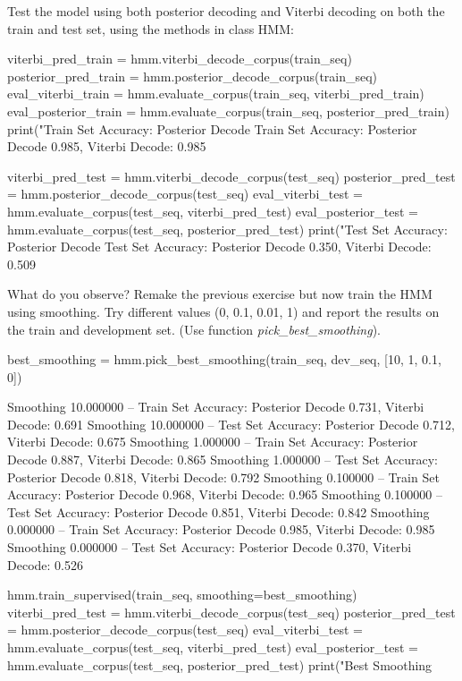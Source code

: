 \begin{exercise}
Test the model using both posterior decoding and Viterbi decoding on
both the train and test set, using the methods in class HMM:
\begin{python}
viterbi_pred_train = hmm.viterbi_decode_corpus(train_seq)
posterior_pred_train = hmm.posterior_decode_corpus(train_seq)
eval_viterbi_train =   hmm.evaluate_corpus(train_seq, viterbi_pred_train)
eval_posterior_train =  hmm.evaluate_corpus(train_seq, posterior_pred_train)
print("Train Set Accuracy: Posterior Decode %
Train Set Accuracy: Posterior Decode 0.985, Viterbi Decode: 0.985

viterbi_pred_test = hmm.viterbi_decode_corpus(test_seq)
posterior_pred_test = hmm.posterior_decode_corpus(test_seq)
eval_viterbi_test =   hmm.evaluate_corpus(test_seq, viterbi_pred_test)
eval_posterior_test = hmm.evaluate_corpus(test_seq, posterior_pred_test)
print("Test Set Accuracy: Posterior Decode %
Test Set Accuracy: Posterior Decode 0.350, Viterbi Decode: 0.509
\end{python}
What do you observe? Remake the previous exercise but now train the HMM
using smoothing. Try different values (0, 0.1, 0.01, 1) and report the results on the
train and development set. (Use function \emph{pick\_best\_smoothing}).


\begin{python}
best_smoothing = hmm.pick_best_smoothing(train_seq, dev_seq, [10, 1, 0.1, 0])

Smoothing 10.000000 --  Train Set Accuracy: Posterior Decode 0.731, Viterbi Decode: 0.691
Smoothing 10.000000 -- Test Set Accuracy: Posterior Decode 0.712, Viterbi Decode: 0.675
Smoothing 1.000000 --  Train Set Accuracy: Posterior Decode 0.887, Viterbi Decode: 0.865
Smoothing 1.000000 -- Test Set Accuracy: Posterior Decode 0.818, Viterbi Decode: 0.792
Smoothing 0.100000 --  Train Set Accuracy: Posterior Decode 0.968, Viterbi Decode: 0.965
Smoothing 0.100000 -- Test Set Accuracy: Posterior Decode 0.851, Viterbi Decode: 0.842
Smoothing 0.000000 --  Train Set Accuracy: Posterior Decode 0.985, Viterbi Decode: 0.985
Smoothing 0.000000 -- Test Set Accuracy: Posterior Decode 0.370, Viterbi Decode: 0.526

hmm.train_supervised(train_seq, smoothing=best_smoothing)
viterbi_pred_test = hmm.viterbi_decode_corpus(test_seq)
posterior_pred_test = hmm.posterior_decode_corpus(test_seq)
eval_viterbi_test =   hmm.evaluate_corpus(test_seq, viterbi_pred_test)
eval_posterior_test = hmm.evaluate_corpus(test_seq, posterior_pred_test)
print("Best Smoothing %


\end{python}
\end{exercise}
